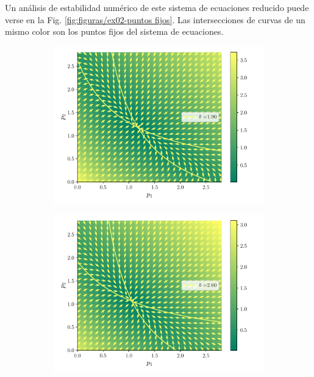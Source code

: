 \documentclass[twocolumn,aps,prl]{revtex4-1}
\begin{document}
Un análisis de estabilidad numérico de este sistema de ecuaciones reducido puede verse en la Fig. \ref{fig:figuras/ex02-puntos fijos}. Las intersecciones de curvas de un mismo color son los puntos fijos del sistema de ecuaciones.


\begin{figure}[ht!]
  \centering
  \begin{subfigure}[b]{0.49\linewidth}
      \centering
      \includegraphics[width = 0.999\textwidth]{figuras/ex02-cosa3-0.pdf}
  \end{subfigure}\quad
  \begin{subfigure}[b]{0.49\linewidth}
      \centering
      \includegraphics[width = 0.999\textwidth]{figuras/ex02-cosa3-1.pdf}

\end{subfigure}
\end{figure}
\end{document}
